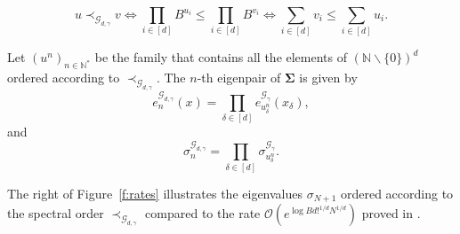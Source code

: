 \documentclass[twoside,11pt]{book}
\numberwithin{theorem}{chapter}
\numberwithin{definition}{chapter}
\numberwithin{proposition}{chapter}
\numberwithin{corollary}{chapter}
\numberwithin{example}{chapter}
\numberwithin{lemma}{chapter}
\numberwithin{assumption}{chapter}
\numberwithin{equation}{chapter}
\numberwithin{figure}{chapter}
\DeclareMathOperator{\Tran}{\intercal}
\DeclareMathOperator{\X}{\mathcal{X}}
\begin{document}
\begin{equation}
u \prec_{\mathcal{G}_{d,\gamma}} v   \iff \prod\limits_{i \in [d]} B^{u_{i}}  \leq \prod\limits_{i \in [d]} B^{v_{i}}  \iff \sum\limits_{i \in [d]} v_{i}   \leq \sum\limits_{i \in [d]} u_{i} .
\label{e:orderGaussian}
\end{equation}

Let $(u^{n})_{n \in \mathbb{N}^{*}}$ be the family that contains all the elements of $(\mathbb{N} \smallsetminus \{0\})^d$  ordered according to $\prec_{\mathcal{G}_{d,\gamma}}$. The $n$-th eigenpair of $\bm{\Sigma}$ is given by
\begin{equation}
e_{n}^{\mathcal{G}_{d,\gamma}}(x) = \prod\limits_{\delta \in [d]} e_{u_{\delta}^{n}}^{\mathcal{G}_{\gamma}}(x_{\delta}),
\end{equation}
and
\begin{equation}
\sigma_{n}^{\mathcal{G}_{d,\gamma}} = \prod\limits_{\delta \in [d]} \sigma_{u_{\delta}^{n}}^{\mathcal{G}_{\gamma}}.
\end{equation}

The right of Figure~\ref{f:rates} illustrates the eigenvalues $\sigma_{N+1}$ ordered according to the spectral order $\prec_{\mathcal{G}_{d,\gamma}}$ compared to the rate $\mathcal{O}(e^{\log B d!^{1/d} N^{1/d}})$ proved in \citep{Bac17}.




\end{document}

